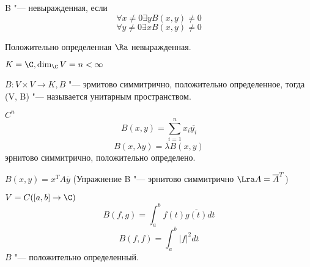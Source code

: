 \begin{Def}
B "--- невыражденная, если 
$$\forall x \ne 0 \exists y B(x, y) \ne 0$$
$$\forall y \ne 0 \exists x B(x, y) \ne 0$$
\end{Def}

Положительно определенная $\Ra$ невыражденная.
\begin{Def}
$K = \C, \dim_{\C}V = n < \infty$

$B \colon V \times V \to K, B$ "--- эрмитово симмитрично, положительно определенное,
тогда (V, B) "--- называется унитарным пространством. 
\end{Def}

\begin{exmp}
\item $C^n$
 $$B(x, y) = \sum_{i = 1}^{n}x_i\overline{y_i}$$
 $$B(x, \lambda y) = \overline{\lambda}B(x, y)$$
 эрнитово симмитрично, положительно определено.
\item $B(x, y) = x^{T}A\overline{y}$
(Упражнение B "--- эрнитово  симмитрично $\Lra A  = \overline{A}^{T}$)
\item $V = C([a, b] \to \C)$
$$B(f, g) = \int_{a}^{b}f(t)\overline{g(t)}dt$$  
$$B(f, f) = \int_{a}^{b}|f|^2dt$$
$B$ "--- положительно определенный. 
\end{exmp}    
